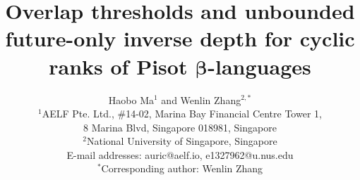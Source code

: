 \documentclass[12pt,a4paper]{article}
\title{Overlap thresholds and unbounded future-only inverse depth for cyclic ranks of
Pisot $\boldsymbol{\beta}$-languages}
\author{Haobo Ma$^{1}$ and Wenlin Zhang$^{2,*}$\\[4pt]
{\small $^1$AELF Pte. Ltd., \#14-02, Marina Bay Financial Centre Tower 1,}\\
{\small 8 Marina Blvd, Singapore 018981, Singapore}\\
{\small $^2$National University of Singapore, Singapore}\\[2pt]
{\small E-mail addresses: auric@aelf.io, e1327962@u.nus.edu}\\
{\small $^*$Corresponding author: Wenlin Zhang}}
\date{}
\theoremstyle{definition}
\theoremstyle{plain}
\theoremstyle{remark}
\numberwithin{equation}{section}
\begin{document}
\linenumbers
\maketitle















\end{document}
